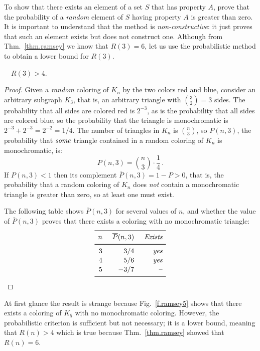 To show that there exists an element of a set $S$ that has property $A$, prove that the probability of a \emph{random} element of $S$ having property $A$ is greater than zero. It is important to understand that the method is \emph{non-constructive}: it just proves that such an element exists but does not construct one. Although from Thm.~\ref{thm.ramsey} we know that $R(3)=6$, let us use the probabilistic method to obtain a lower bound for $R(3)$.

\newpage

\begin{theorem}[Erd\H{o}s]
$\quad R(3) > 4$.
\end{theorem}
\begin{proof}
Given a \emph{random} coloring of $K_n$ by the two colors red and blue, consider an arbitrary subgraph $K_3$, that is, an arbitrary triangle with $\binom{3}{2}=3$ sides. The probability that all sides are colored red is $2^{-3}$, as is the probability that all sides are colored blue, so the probability that the triangle is monochromatic is $2^{-3}+2^{-3}=2^{-2}=1/4$. The number of triangles in $K_n$ is $\binom{n}{3}$, so $P(n,3)$, the probability that $\emph{some}$ triangle contained in a random coloring of $K_n$ is monochromatic, is:
\[
P(n,3)=\binom{n}{3}\cdot \frac{1}{4}\,.
\]
If $P(n,3)<1$ then its complement $\overline{P}(n,3)=1-P>0$, that is, the probability that a random coloring of $K_n$ does \emph{not} contain a monochromatic triangle is greater than zero, so at least one must exist.

The following table shows $\overline{P}(n,3)$ for several values of $n$, and whether the value of $\overline{P}(n,3)$ proves that there exists a coloring with no monochromatic triangle:
\[
\renewcommand*{\arraystretch}{1.1}
\begin{array}{r@{\hspace{5mm}}r@{\hspace{5mm}}r}
\hline
\noalign{\smallskip}
n & \overline{P}(n,3) & \textit{Exists}\\
\noalign{\smallskip}\svhline\noalign{\smallskip}
3 & 3/4 & \textit{yes} \\
4 & 5/6 & \textit{yes}\\
5 & -3/7 & \textrm{--}\\
\noalign{\smallskip}
 \hline
 \end{array}
\]
\end{proof}
At first glance the result is strange because Fig.~\ref{f.ramsey5} shows that there exists a coloring of $K_5$ with no monochromatic coloring. However, the probabilistic criterion is sufficient but not necessary; it is a lower bound, meaning that $R(n)>4$ which is true because Thm.~\ref{thm.ramsey} showed that $R(n)=6$.

